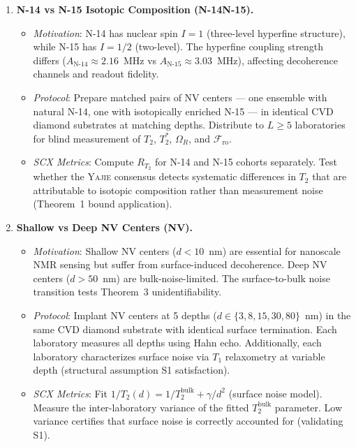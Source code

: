\documentclass[11pt,a4paper]{article}
\theoremstyle{definition}
\newcommand{\Yajie}{\textsc{Yajie}}
\newcommand{\Ttwo}{T_2}
\newcommand{\TtwoStar}{T_2^*}
\newcommand{\Tone}{T_1}
\newcommand{\NV}{NV}
\newcommand{\RabiFreq}{\Omega_R}
\newcommand{\FidReadout}{\mathcal{F}_{\text{ro}}}
\begin{document}
\begin{enumerate}[label=\textbf{B\arabic*:}, leftmargin=*]

    \item \textbf{N-14 vs N-15 Isotopic Composition (N-14N-15).}
    \begin{itemize}[nosep]
        \item \textit{Motivation}: N-14 has nuclear spin $I=1$ (three-level
        hyperfine structure), while N-15 has $I=1/2$ (two-level). The hyperfine
        coupling strength differs ($A_{\text{N-14}} \approx 2.16$~MHz vs
        $A_{\text{N-15}} \approx 3.03$~MHz), affecting decoherence channels
        and readout fidelity.
        \item \textit{Protocol}: Prepare matched pairs of \NV{} centers — one
        ensemble with natural N-14, one with isotopically enriched N-15 — in
        identical CVD diamond substrates at matching depths. Distribute to
        $L \geq 5$ laboratories for blind measurement of $\Ttwo$, $\TtwoStar$,
        $\RabiFreq$, and $\FidReadout$.
        \item \textit{SCX Metrics}: Compute $R_{\Ttwo}$ for N-14 and N-15
        cohorts separately. Test whether the \Yajie{} consensus detects
        systematic differences in $\Ttwo$ that are attributable to isotopic
        composition rather than measurement noise (Theorem~1 bound application).
    \end{itemize}

    \item \textbf{Shallow vs Deep NV Centers (NV).}
    \begin{itemize}[nosep]
        \item \textit{Motivation}: Shallow \NV{} centers ($d < 10$~nm) are
        essential for nanoscale NMR sensing but suffer from surface-induced
        decoherence. Deep \NV{} centers ($d > 50$~nm) are bulk-noise-limited.
        The surface-to-bulk noise transition tests Theorem~3 unidentifiability.
        \item \textit{Protocol}: Implant \NV{} centers at 5 depths ($d \in \{3, 8, 15, 30, 80\}$~nm)
        in the same CVD diamond substrate with identical surface termination.
        Each laboratory measures all depths using Hahn echo. Additionally,
        each laboratory characterizes surface noise via $\Tone$ relaxometry
        at variable depth (structural assumption S1 satisfaction).
        \item \textit{SCX Metrics}: Fit $1/\Ttwo(d) = 1/\Ttwo^{\text{bulk}} + \gamma/d^2$
        (surface noise model). Measure the inter-laboratory variance of the
        fitted $\Ttwo^{\text{bulk}}$ parameter. Low variance certifies that
        surface noise is correctly accounted for (validating S1).
    \end{itemize}


\end{enumerate}
\end{document}
